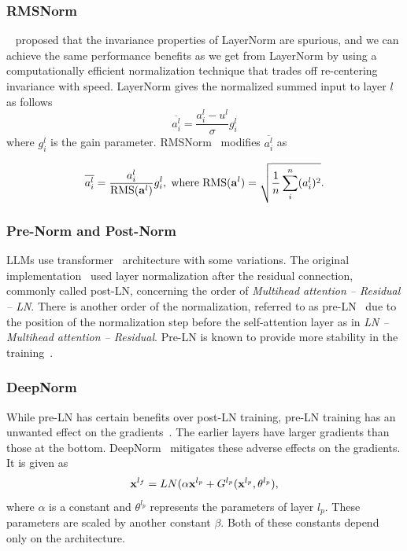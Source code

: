 \subsubsection{RMSNorm}
~\cite{rmsnorm} proposed that the invariance properties of LayerNorm are spurious, and we can achieve the same performance benefits as we get from LayerNorm by using a computationally efficient normalization technique that trades off re-centering invariance with speed. LayerNorm gives the normalized summed input to layer $l$ as follows
\begin{equation}
\overline{a_i^l} = \frac{a_i^l - u^l}{\sigma}g_i^l 
\end{equation}
where $g_i^l$ is the gain parameter. RMSNorm~\cite{rmsnorm} modifies $\overline{a_i^l}$ as

\begin{equation}
\overline{a_i^l} = \frac{a_i^l}{\textnormal{RMS}(\mathbf{a}^l)} g_i^l, \hspace{0.3em} \textnormal{where} \hspace{0.3em} \textnormal{RMS}(\mathbf{a}^l) = \sqrt{\frac{1}{n}\sum_{i}^{n}(a_i^l)^2}.
\end{equation}

\subsubsection{Pre-Norm and Post-Norm}
LLMs use transformer~\cite{Transformers} architecture with some variations. The original implementation~\cite{Transformers} used layer normalization after the residual connection, commonly called post-LN, concerning the order of \textit{Multihead attention – Residual – LN}. There is another order of the normalization, referred to as pre-LN~\cite{preLN} due to the position of the normalization step before the self-attention layer as in \textit{LN – Multihead attention – Residual}. Pre-LN is known to provide more stability in the training~\cite{shleifer2021normformer}. 

\subsubsection{DeepNorm}
While pre-LN has certain benefits over post-LN training, pre-LN training has an unwanted effect on the gradients~\cite{shleifer2021normformer}. The earlier layers have larger gradients than those at the bottom. DeepNorm~\cite{deepnorm} mitigates these adverse effects on the gradients. It is given as
\begin{equation}
\mathbf{x}^{l_f} = LN(\alpha \mathbf{x}^{l_p} + G^{l_p}(\mathbf{x}^{l_p}, {\boldmath\theta}{^{l_p}}), 
\end{equation}
where $\alpha$ is a constant and $\theta^{l_p}$ represents the parameters of layer $l_p$. These parameters are scaled by another constant $\beta$. Both of these constants depend only on the architecture. 

